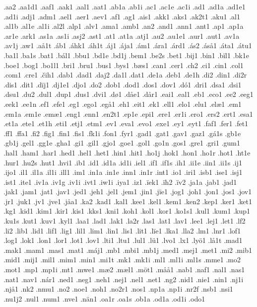 .aa2
.aa1d1
.aaf1
.aak1
.aal1
.aat1
.ab1a
.ab1i
.ac1
.ac1e
.ac1i
.ad1
.ad1a
.ad1e1
.ad1i
.adj1
.adm1
.ael1
.aer1
.aev1
.af1
.ag1
.ais1
.akk1
.aks1
.ak2t1
.aku1
.al1
.al1b
.al1e
.al1i
.al2l
.alp1
.alv1
.ama1
.amb1
.an2
.and1
.ann1
.ant1
.ap1
.ap1a
.ar1e
.ark1
.as1a
.as1i
.asj2
.ast1
.at1
.at1a
.atj1
.au2
.au1e1
.aur1
.aut1
.av1a
.av1j
.aw1
.aå1t
.áb1
.áhk1
.áh1t
.áj1
.ája1
.ám1
.ára1
.árd1
.ás2
.áså1
.áta1
.átu1
.ba1l
.ba1s
.bat1
.bál1
.bbu1
.bd1e
.bd1j
.bem1
.be2s
.bet1
.bij1
.bin1
.bïl1
.bk1e
.boe1
.bog1
.bo1l1
.bri1
.bru1
.bus1
.bys1
.bæs1
.can1
.cer1
.ch2
.ci1
.cin1
.col1
.com1
.cre1
.čih1
.dab1
.dad1
.daj2
.da1l
.dat1
.de1a
.deb1
.de1h
.di2
.din1
.di2r
.dis1
.dit1
.dïj1
.dj1e1
.djo1
.do2
.dob1
.dod1
.dos1
.dov1
.dó1
.dri1
.dsa1
.dsi1
.dsu1
.du2
.dul1
.dup1
.dus1
.dvi1
.dø1
.dåe1
.dår1
.eai1
.eal1
.eb1
.eco1
.ee2
.eeg1
.eek1
.ee1n
.ef1
.efe1
.eg1
.ego1
.egå1
.eh1
.eit1
.ek1
.ell1
.elo1
.elu1
.elæ1
.em1
.em1a
.em1e
.emæ1
.eng1
.enn1
.en2t1
.ep1e
.epi1
.ere1
.er1i
.ero1
.ers2
.ert1
.esa1
.et1a
.ete1
.et1h
.eti1
.etj1
.etm1
.ev1
.eva1
.evo1
.exe1
.ey1
.eyt1
.faf1
.fer1
.fet1
.ff1
.ffa1
.fi2
.fig1
.fin1
.fis1
.fk1i
.fon1
.fyr1
.gad1
.gat1
.gav1
.gaz1
.gá1s
.gb1e
.gb1j
.gel1
.gg1e
.gha1
.gi1
.gil1
.gjo1
.goe1
.gol1
.go1n
.gos1
.gre1
.gri1
.gum1
.hal1
.ham1
.har1
.hed1
.hel1
.het1
.hin1
.hit1
.ho1j
.hok1
.hon1
.ho1r
.hot1
.ht1e
.hur1
.hu2s
.hut1
.hvi1
.ib1
.id1
.id1a
.id1i
.iel1
.if1
.if1s
.ih1
.ii1e
.iin1
.ii1s
.ij1
.ijo1
.il1
.il1a
.il1i
.ill1
.im1
.in1a
.in1e
.inn1
.in1r
.int1
.io1
.iri1
.isb1
.ise1
.isj1
.ist1
.ite1
.iv1a
.iv1g
.iv1i
.ivt1
.iw1i
.iya1
.iz1
.ïek1
.ïh2
.ïv2
.ja1a
.jab1
.jad1
.jak1
.jam1
.jat1
.jav1
.jed1
.jeh1
.jel1
.jem1
.jin1
.jïe1
.jog1
.joh1
.jon1
.jos1
.jov1
.jr1
.juk1
.jv1
.jve1
.jåa1
.ka2
.kad1
.kal1
.kee1
.kel1
.kem1
.ken2
.kep1
.ker1
.ket1
.kg1
.kid1
.kim1
.kir1
.kis1
.kks1
.kni1
.koh1
.kol1
.kor1
.ko1s1
.kul1
.kum1
.kup1
.ku1s
.kut1
.kuv1
.kyl1
.laa1
.lad1
.lak1
.la2r
.las1
.lat1
.lav1
.lee1
.lej1
.let1
.lf2
.li2
.lib1
.lid1
.lif1
.lig1
.lil1
.lim1
.lin1
.lis1
.lit1
.lïe1
.lka1
.lla2
.lm1
.lnr1
.lof1
.log1
.lok1
.lon1
.lor1
.lot1
.lov1
.lti1
.ltu1
.lul1
.lü1
.lvo1
.lx1
.lyö1
.lå1t
.mad1
.mak1
.mam1
.mas1
.mat1
.máj1
.mb1
.mbi1
.mb1j
.med1
.mej1
.met1
.mi2
.mib1
.mid1
.mij1
.mil1
.mim1
.min1
.mi1t
.mk1
.mk1i
.ml1
.ml1i
.ml1s
.mme1
.mo2
.mot1
.mp1
.mp1i
.mt1
.mwe1
.mæ2
.mæl1
.möt1
.måå1
.nab1
.naf1
.nal1
.nas1
.nat1
.nav1
.nár1
.ned1
.neg1
.neh1
.nej1
.nel1
.net1
.ng2
.nid1
.nie1
.nin1
.nj1i
.njå1
.nk2
.nmu1
.no2
.noe1
.noh1
.no2r1
.nos1
.np1a
.np1i
.nr2f
.nsb1
.nsi1
.nu1j2
.nul1
.num1
.nve1
.nän1
.oa1r
.oa1s
.ob1a
.od1a
.od1i
.odo1
